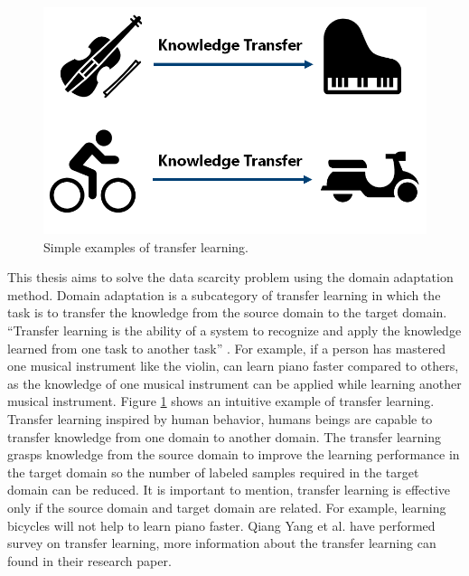 \begin{figure}[H]
        \begin{center}
 	    \includegraphics[scale=0.40]{images/Introduction/TransferLearning.png}
	    \caption[Simple examples of transfer learning.]{Simple examples of transfer learning.}
	    \label{fig:TransferLearning}
	    \end{center}
\end{figure}

This thesis aims to solve the data scarcity problem using the domain adaptation method. Domain adaptation is a subcategory of transfer learning in which the task is to transfer the knowledge from the source domain to the target domain. ``Transfer learning is the ability of a system to recognize and apply the knowledge learned from one task to another task'' \cite{zhuang2020comprehensive}. For example, if a person has mastered one musical instrument like the violin, can learn piano faster compared to others, as the knowledge of one musical instrument can be applied while learning another musical instrument. Figure \ref{fig:TransferLearning} shows an intuitive example of transfer learning. Transfer learning inspired by human behavior, humans beings are capable to transfer knowledge from one domain to another domain. The transfer learning grasps knowledge from the source domain to improve the learning performance in the target domain so the number of labeled samples required in the target domain can be reduced. It is important to mention, transfer learning is effective only if the source domain and target domain are related. For example, learning bicycles will not help to learn piano faster. Qiang Yang et al.\cite{5288526} have performed survey on transfer learning, more information about the transfer learning can found in their research paper.  

